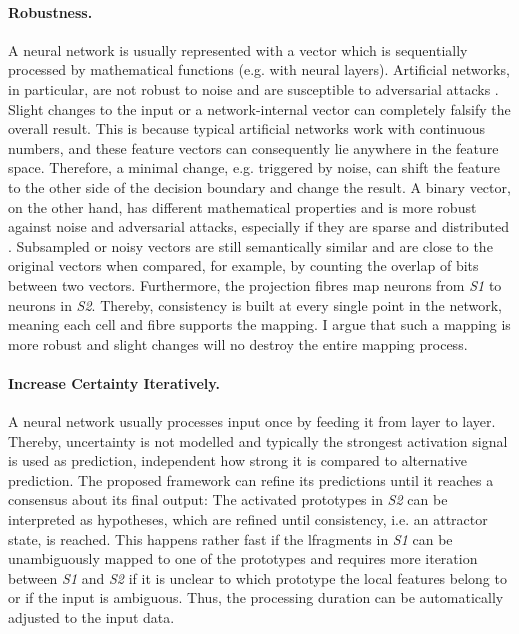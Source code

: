 \paragraph{Robustness.} A neural network is usually represented with a vector which is sequentially processed by mathematical functions (e.g. with neural layers). Artificial networks, in particular, are not robust to noise and are susceptible to adversarial attacks . Slight changes to the input or a network-internal vector can completely falsify the overall result. This is because typical artificial networks work with continuous numbers, and these feature vectors can consequently lie anywhere in the feature space. Therefore, a minimal change, e.g. triggered by noise, can shift the feature to the other side of the decision boundary and change the result. A binary vector, on the other hand, has different mathematical properties and is more robust against noise and adversarial attacks, especially if they are sparse and distributed .
Subsampled or noisy vectors are still semantically similar and are close to the original vectors when compared, for example, by counting the overlap of bits between two vectors.
Furthermore, the projection fibres map neurons from \emph{S1} to neurons in \emph{S2}. Thereby, consistency is built at every single point in the network, meaning each cell and fibre supports the mapping. I argue that such a mapping is more robust and slight changes will no destroy the entire mapping process.

\paragraph{Increase Certainty Iteratively.} A neural network usually processes input once by feeding it from layer to layer. Thereby, uncertainty is not modelled and typically the strongest activation signal is used as prediction, independent how strong it is compared to alternative prediction.
The proposed framework can refine its predictions until it reaches a consensus about its final output: The activated prototypes in \emph{S2} can be interpreted as hypotheses, which are refined until consistency, i.e. an attractor state, is reached. This happens rather fast if the lfragments in \emph{S1} can be unambiguously mapped to one of the prototypes and requires more iteration between \emph{S1} and \emph{S2} if it is unclear to which prototype the local features belong to or if the input is ambiguous. Thus, the processing duration can be automatically adjusted to the input data.

